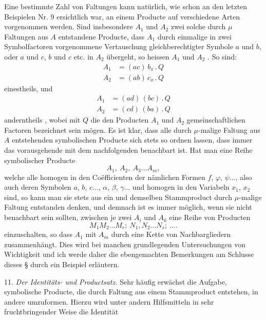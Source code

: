 Eine bestimmte Zahl von Faltungen kann natürlich, wie schon an den
letzten Beispielen Nr. 9 ersichtlich war, an einem Producte auf
verschiedene Arten vorgenommen werden. Sind insbesondere $A_1$ und
$A_2$ zwei solche durch $\mu$ Faltungen aus $A$ entstandene Producte,
dass $A_1$ durch einmalige in zwei Symbolfactoren vorgenommene
Vertauschung gleichberechtigter Symbole $a$ und $b$, oder $a$ und $c$,
$b$ und $c$ etc. in $A_2$ übergeht, so heissen $A_1$ und $A_2$
. So sind:
\[
\begin{aligned}
A_1 &= (ac)\, b_x \,.\, Q \\
A_2 &= (ab)\, c_x \,.\, Q
\end{aligned}
\]
einestheils, und
\[
\begin{aligned}
A_1 &= (ad)\, (bc) \,.\, Q \\
A_2 &= (cd)\, (ba) \,.\, Q
\end{aligned}
\]
anderntheils , wobei mit $Q$ die den
Producten $A_1$ und $A_2$ gemeinschaftlichen Factoren bezeichnet sein
mögen. Es ist klar, dass alle durch $\mu$-malige Faltung aus $A$
entstehenden symbolischen Producte sich stets so ordnen lassen, dass
immer das vorausgehende mit dem nachfolgenden benachbart ist. Hat man
eine Reihe symbolischer Producte
\[
A_1, \ A_2, \ A_3 \dots A_m ,
\]
welche alle homogen in den Co\"efficienten der nämlichen Formen $f$,
$\varphi$, $\psi \dots$, also auch deren Symbolen $a$, $b$, $c \dots$,
$\alpha$, $\beta$, $\gamma \dots$ und homogen in den Variabeln $x_1$,
$x_2$ sind, so kann man sie stets aus ein und demselben Stammproduct
durch $\mu$-malige Faltung entstanden denken, und demnach ist es immer
möglich, wenn sie nicht benachbart sein sollten, zwischen je zwei
$A_i$ und $A_k$ eine Reihe von Producten
\[
M_1 M_2 \dots M_r; \ N_1, N_2 \dots N_s; \ \dots.
\]
einzuschalten, so dass $A_1$ mit $A_m$ durch eine Kette von
Nachbargliedern zusammenhängt. Dies wird bei manchen grundlegenden
Untersuchungen von Wichtigkeit und ich werde daher die ebengemachten
Bemerkungen am Schlusse dieses \S{} durch ein Beispiel erläutern.

11. \textit{Der Identitäts- und Productsatz.} Sehr häufig erwächst die
Aufgabe, symbolische Producte, die durch Faltung aus einem
Stammproduct entstehen, in andere umzuformen. Hierzu wird unter andern
Hilfsmitteln in sehr fruchtbringender Weise die Identität

